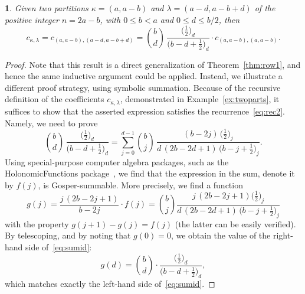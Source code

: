 \documentclass{mathincs}
\numberwithin{equation}{section}
\numberwithin{figure}{section}
\theoremstyle{plain}
\theoremstyle{definition}
\theoremstyle{remark}
\theoremstyle{plain}
\newtheorem{prop}[thm]{\protect\propositionname}
\theoremstyle{definition}
\theoremstyle{plain}
\theoremstyle{plain}
\providecommand{\propositionname}{Proposition}
\begin{document}
\begin{prop}\label{prop:p2row}
  Given two partitions $\kappa=(a,a-b)$ and $\lambda=(a-d,a-b+d)$ of the positive integer $n=2a-b$,
  with $0\leq b<a$ and $0\leq d\leq b/2$, then
  \begin{equation}\label{eq:2PartRec}
    c_{\kappa,\lambda} = c_{(a,a-b),(a-d,a-b+d)} =
    \binom{b}{d}\,\frac{\bigl(\frac12\bigr)_{\!d}}{\bigl(b-d+\frac12\bigr)_{\!d}} \cdot c_{(a,a-b),(a,a-b)}.
  \end{equation}
\end{prop}
\begin{proof}
  Note that this result is a direct generalization of Theorem~\ref{thm:row1},
  and hence the same inductive argument could be applied. Instead, we
  illustrate a different proof strategy, using symbolic summation. Because of
  the recursive definition of the coefficients $c_{\kappa,\lambda}$,
  demonstrated in Example~\ref{ex:twoparts}, it suffices to show that the
  asserted expression satisfies the recurrence~\eqref{eq:rec2}. Namely, we
  need to prove
  \begin{equation}\label{eq:sumid}
    \binom{b}{d}\,\frac{\bigl(\frac12\bigr)_{\!d}}{\bigl(b-d+\frac12\bigr)_{\!d}} =
    \sum_{j=0}^{d-1} \binom{b}{j}\,\frac{(b-2j)\,\bigl(\frac12\bigr)_{\!j}}{d\,(2b-2d+1)\,\bigl(b-j+\frac12\bigr)_{\!j}}.
  \end{equation}
  Using special-purpose computer algebra packages, such as the
  HolonomicFunctions package~\cite{HolonomicFunctions}, we find that the
  expression in the sum, denote it by $f(j)$, is Gosper-summable. More
  precisely, we find a function
  \[
    g(j) = \frac{j\,(2b-2j+1)}{b-2j} \cdot f(j) =
    \binom{b}{j}\frac{j\,(2b-2j+1) \bigl(\frac12\bigr)_{\!j}}{d\,(2b-2d+1)\,\bigl(b-j+\frac12\bigr)_{\!j}}
  \]
  with the property $g(j+1)-g(j)=f(j)$ (the latter can be easily
  verified). By telescoping, and by noting that $g(0)=0$, we obtain
  the value of the right-hand side of~\eqref{eq:sumid}:
  \[
    g(d) = \binom{b}{d}\cdot\frac{\bigl(\frac12\bigr)_{\!d}}{\bigl(b-d+\frac12\bigr)_{\!d}},
  \]
  which matches exactly the left-hand side of~\eqref{eq:sumid}.
\end{proof}
\end{document}
